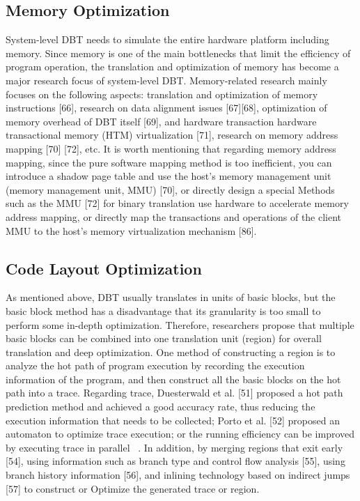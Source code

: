 \subsection{Memory Optimization}
System-level DBT needs to simulate the entire hardware platform including memory.
Since memory is one of the main bottlenecks that limit the efficiency of program operation, the translation and optimization of memory has become a major research focus of system-level DBT.
Memory-related research mainly focuses on the following aspects: translation and optimization of memory instructions [66], research on data alignment issues [67][68], optimization of memory overhead of DBT itself [69], and hardware transaction hardware transactional memory (HTM) virtualization [71], research on memory address mapping [70] [72], etc.
It is worth mentioning that regarding memory address mapping, since the pure software mapping method is too inefficient, you can introduce a shadow page table and use the host's memory management unit (memory management unit, MMU) [70], or directly design a special Methods such as the MMU [72] for binary translation use hardware to accelerate memory address mapping, or directly map the transactions and operations of the client MMU to the host's memory virtualization mechanism [86].

\subsection{Code Layout Optimization}
As mentioned above, DBT usually translates in units of basic blocks, but the basic block method has a disadvantage that its granularity is too small to perform some in-depth optimization.
Therefore, researchers propose that multiple basic blocks can be combined into one translation unit (region) for overall translation and deep optimization.
One method of constructing a region is to analyze the hot path of program execution by recording the execution information of the program, and then construct all the basic blocks on the hot path into a trace.
Regarding trace, Duesterwald et al. [51] proposed a hot path prediction method and achieved a good accuracy rate, thus reducing the execution information that needs to be collected; Porto et al. [52] proposed an automaton to optimize trace execution; or the running efficiency can be improved by executing trace in parallel ~\cite{Bhm2011GeneralizedJT}.
In addition, by merging regions that exit early [54], using information such as branch type and control flow analysis [55], using branch history information [56], and inlining technology based on indirect jumps [57] to construct or Optimize the generated trace or region.

